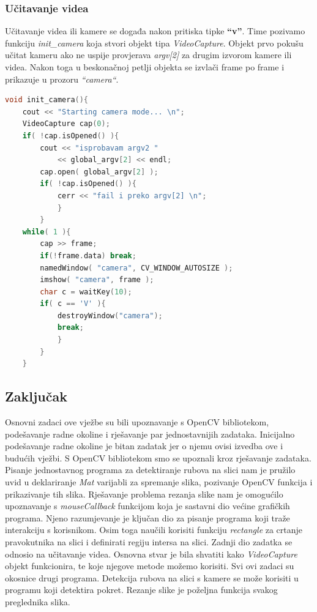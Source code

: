 \subsubsection{Učitavanje videa}
Učitavanje videa ili kamere se događa nakon pritiska tipke
\textbf{``v''}. Time pozivamo funkciju \textit{init\_camera} koja
stvori objekt tipa \textit{VideoCapture}. Objekt prvo pokušu učitat
kameru ako ne uspije provjerava \textit{argv[2]} za drugim izvorom
kamere ili videa. Nakon toga u beskonačnoj petlji objekta se izvlači 
frame po frame i prikazuje u prozoru \textit{``camera``}.
\\
\begin{lstlisting}[language=C,caption={Učitavanje videa}]
void init_camera(){
    cout << "Starting camera mode... \n";
    VideoCapture cap(0);
    if( !cap.isOpened() ){
        cout << "isprobavam argv2 " 
            << global_argv[2] << endl;
        cap.open( global_argv[2] );
        if( !cap.isOpened() ){
            cerr << "fail i preko argv[2] \n"; 
            } 
        }
    while( 1 ){
        cap >> frame;
        if(!frame.data) break;
        namedWindow( "camera", CV_WINDOW_AUTOSIZE );
        imshow( "camera", frame );
        char c = waitKey(10);
        if( c == 'V' ){
            destroyWindow("camera");
            break; 
            } 
        } 
    }
\end{lstlisting}


\subsection{Zaključak}


Osnovni zadaci ove vježbe su bili upoznavanje s OpenCV bibliotekom,
podešavanje radne okoline i rješavanje par jednostavnijih zadataka.
Inicijalno podešavanje radne okoline je bitan zadatak jer o njemu ovisi
izvedba ove i budućih vježbi.
S OpenCV bibliotekom smo se upoznali kroz rješavanje zadataka.
Pisanje jednostavnog programa za detektiranje rubova na slici nam je
pružilo uvid u deklariranje \textit{Mat} varijabli za spremanje slika,
pozivanje OpenCV funkcija i prikazivanje tih slika.
Rješavanje problema rezanja slike nam je omogućilo upoznavanje s
\textit{mouseCallback} funkcijom koja je sastavni dio većine grafičkih
programa. Njeno razumjevanje je ključan dio za pisanje programa koji traže
interakciju s korisnikom. Osim toga naučili korisiti funkciju
\textit{rectangle} za crtanje pravokutnika na slici i definirati regiju
intersa na slici. 
Zadnji dio zadatka se odnosio na učitavanje videa. Osnovna stvar je bila
shvatiti kako \textit{VideoCapture} objekt funkcionira, te koje njegove
metode možemo korisiti.
Svi ovi zadaci su okosnice drugi programa. Detekcija rubova na slici s
kamere se može korisiti u programu koji detektira pokret.
Rezanje slike je poželjna funkcija svakog preglednika slika.

